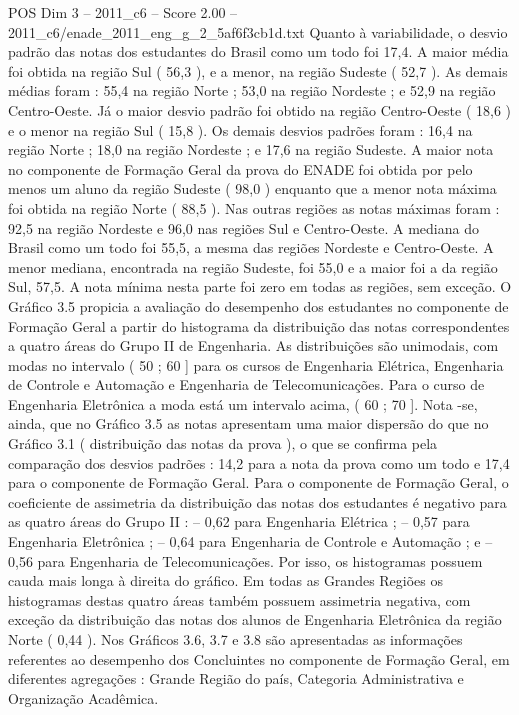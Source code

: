 \begin{textsample}{POS Dim 3 – 2011\_c6 – Score 2.00 – 2011\_c6/enade\_2011\_eng\_g\_2\_5af6f3cb1d.txt}
Quanto à variabilidade, o desvio padrão das notas dos estudantes do Brasil como um todo foi 17,4.
A maior média foi obtida na região Sul ( 56,3 ), e a menor, na região Sudeste ( 52,7 ).
As demais médias foram : 55,4 na região Norte ; 53,0 na região Nordeste ; e 52,9 na região Centro-Oeste.
Já o maior desvio padrão foi obtido na região Centro-Oeste ( 18,6 ) e o menor na região Sul ( 15,8 ).
Os demais desvios padrões foram : 16,4 na região Norte ; 18,0 na região Nordeste ; e 17,6 na região Sudeste.
A maior nota no componente de Formação Geral da prova do ENADE foi obtida por pelo menos um aluno da região Sudeste ( 98,0 ) enquanto que a menor nota máxima foi obtida na região Norte ( 88,5 ).
Nas outras regiões as notas máximas foram : 92,5 na região Nordeste e 96,0 nas regiões Sul e Centro-Oeste.
A mediana do Brasil como um todo foi 55,5, a mesma das regiões Nordeste e Centro-Oeste.
A menor mediana, encontrada na região Sudeste, foi 55,0 e a maior foi a da região Sul, 57,5.
A nota mínima nesta parte foi zero em todas as regiões, sem exceção.
O Gráfico 3.5 propicia a avaliação do desempenho dos estudantes no componente de Formação Geral a partir do histograma da distribuição das notas correspondentes a quatro áreas do Grupo II de Engenharia.
As distribuições são unimodais, com modas no intervalo ( 50 ; 60 ] para os cursos de Engenharia Elétrica, Engenharia de Controle e Automação e Engenharia de Telecomunicações.
Para o curso de Engenharia Eletrônica a moda está um intervalo acima, ( 60 ; 70 ].
Nota -se, ainda, que no Gráfico 3.5 as notas apresentam uma maior dispersão do que no Gráfico 3.1 ( distribuição das notas da prova ), o que se confirma pela comparação dos desvios padrões : 14,2 para a nota da prova como um todo e 17,4 para o componente de Formação Geral.
Para o componente de Formação Geral, o coeficiente de assimetria da distribuição das notas dos estudantes é negativo para as quatro áreas do Grupo II : – 0,62 para Engenharia Elétrica ; – 0,57 para Engenharia Eletrônica ; – 0,64 para Engenharia de Controle e Automação ; e – 0,56 para Engenharia de Telecomunicações.
Por isso, os histogramas possuem cauda mais longa à direita do gráfico.
Em todas as Grandes Regiões os histogramas destas quatro áreas também possuem assimetria negativa, com exceção da distribuição das notas dos alunos de Engenharia Eletrônica da região Norte ( 0,44 ).
Nos Gráficos 3.6, 3.7 e 3.8 são apresentadas as informações referentes ao desempenho dos Concluintes no componente de Formação Geral, em diferentes agregações : Grande Região do país, Categoria Administrativa e Organização Acadêmica.

\end{textsample}
